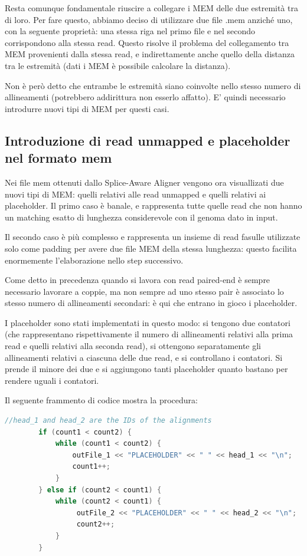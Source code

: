 Resta comunque fondamentale riuscire a collegare i MEM delle due estremità tra di loro. Per fare questo, abbiamo deciso di utilizzare due file .mem anziché uno, con la seguente proprietà: una stessa riga nel primo file e nel secondo corrispondono alla stessa read. Questo risolve il problema del collegamento tra MEM provenienti dalla stessa read, e indirettamente anche quello della distanza tra le estremità (dati i MEM è possibile calcolare la distanza).

Non è però detto che entrambe le estremità siano coinvolte nello stesso numero di allineamenti (potrebbero addirittura non esserlo affatto). E' quindi necessario introdurre nuovi tipi di MEM per questi casi.


\subsection{Introduzione di read unmapped e placeholder nel formato mem}
Nei file mem ottenuti dallo Splice-Aware Aligner vengono ora visuallizati due nuovi tipi di MEM: quelli relativi alle read unmapped e quelli relativi ai placeholder. Il primo caso è banale, e rappresenta tutte quelle read che non hanno un matching esatto di lunghezza considerevole con il genoma dato in input.

Il secondo caso è più complesso e rappresenta un insieme di read fasulle utilizzate solo come padding per avere due file MEM della stessa lunghezza: questo facilita enormemente l'elaborazione nello step successivo. 
\newpage

Come detto in precedenza quando si lavora con read paired-end è sempre necessario lavorare a coppie, ma non sempre ad uno stesso pair è associato lo stesso numero di allineamenti secondari: è qui che entrano in gioco i placeholder. 

I placeholder sono stati implementati in questo modo: si tengono due contatori (che rappresentano rispettivamente il numero di allineamenti relativi alla prima read e quelli relativi alla seconda read), si ottengono separatamente gli allineamenti relativi a ciascuna delle due read, e si controllano i contatori. Si prende il minore dei due e si aggiungono tanti placeholder quanto bastano per rendere uguali i contatori.

Il seguente frammento di codice mostra la procedura:

\begin{lstlisting}[language=C++]
        //head_1 and head_2 are the IDs of the alignments
        if (count1 < count2) {
            while (count1 < count2) {
                outFile_1 << "PLACEHOLDER" << " " << head_1 << "\n";
                count1++;
            }
        } else if (count2 < count1) {
            while (count2 < count1) {
                 outFile_2 << "PLACEHOLDER" << " " << head_2 << "\n";
                 count2++;
            }
        }
\end{lstlisting}


